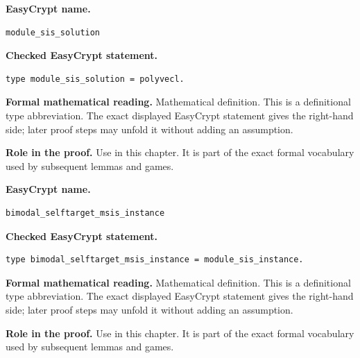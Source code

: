 \begin{formaldefinition}
\noindent\textbf{EasyCrypt name.}
\begin{lstlisting}[language=EasyCrypt,basicstyle=\ttfamily\scriptsize]
module_sis_solution
\end{lstlisting}
\noindent\textbf{Checked EasyCrypt statement.}
\begin{lstlisting}[language=EasyCrypt,basicstyle=\ttfamily\scriptsize]
type module_sis_solution = polyvecl.
\end{lstlisting}
\noindent\textbf{Formal mathematical reading.}
Mathematical definition. This is a definitional type abbreviation.  The exact displayed EasyCrypt statement gives the right-hand side; later proof steps may unfold it without adding an assumption.

\noindent\textbf{Role in the proof.}
Use in this chapter. It is part of the exact formal vocabulary used by subsequent lemmas and games.

\end{formaldefinition}

\begin{formaldefinition}
\noindent\textbf{EasyCrypt name.}
\begin{lstlisting}[language=EasyCrypt,basicstyle=\ttfamily\scriptsize]
bimodal_selftarget_msis_instance
\end{lstlisting}
\noindent\textbf{Checked EasyCrypt statement.}
\begin{lstlisting}[language=EasyCrypt,basicstyle=\ttfamily\scriptsize]
type bimodal_selftarget_msis_instance = module_sis_instance.
\end{lstlisting}
\noindent\textbf{Formal mathematical reading.}
Mathematical definition. This is a definitional type abbreviation.  The exact displayed EasyCrypt statement gives the right-hand side; later proof steps may unfold it without adding an assumption.

\noindent\textbf{Role in the proof.}
Use in this chapter. It is part of the exact formal vocabulary used by subsequent lemmas and games.

\end{formaldefinition}

